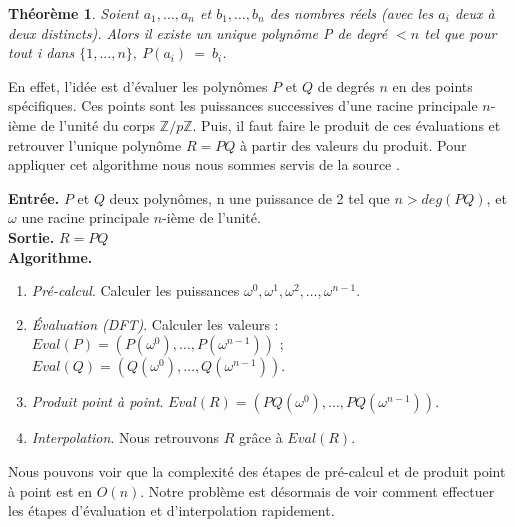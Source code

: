 \documentclass[12pt, a4paper]{article}
\begin{document}
\newtheorem{Thm1}{Théorème}
\begin{Thm1}
Soient $a_1,\dots,a_n$ et $b_1,\dots,b_n$ des nombres réels (avec les $a_i$ deux à deux distincts). Alors il existe un unique polynôme P de degré $< n$ tel que pour tout i dans $\{1,..., n\},\ P(a_i)\ =\ b_i$.
\end{Thm1}

En effet, l’idée est d’évaluer les polynômes $P$ et $Q$ de degrés $n$ en des points spécifiques. Ces points sont les puissances successives d'une racine principale $n$-ième de l'unité du corps $\mathbb{Z}/p\mathbb{Z}$. Puis, il faut faire le produit de ces évaluations et retrouver l’unique polynôme $R=PQ$ à partir des valeurs du produit. Pour appliquer cet algorithme nous nous sommes servis de la source \cite{AECF}. \\
 
\begin{tcolorbox}[colback=cyan!5!white,
                  colframe=cyan!100!black,
                  title=\textbf{Algorithme de multiplication par FFT}
                 ]
\textbf{Entrée.} $P$ et $Q$ deux polynômes, n une puissance de 2 tel que $n>deg(PQ)$, et $\omega$ une racine principale $n$-ième de l’unité. \\
\textbf{Sortie.} $R = PQ$ \\
\textbf{Algorithme.}
\begin{enumerate}[itemsep=-2ex]
\item\textit{Pré-calcul}. Calculer les puissances $\omega^0,\omega^1,\omega^2,\dots,\omega^{n-1}$. \\
\item\textit{Évaluation (DFT)}. Calculer les valeurs : \\ $Eval(P)=(P(\omega^0),\dots,P(\omega^{n-1}))$ ; $Eval(Q)=(Q(\omega^0),\dots,Q(\omega^{n-1}))$. \\
\item\textit{Produit point à point}. $Eval(R) = (PQ(\omega^0),\dots,PQ(\omega^{n-1}))$. \\
\item\textit{Interpolation}. Nous retrouvons $R$ grâce à $Eval(R)$.
\end{enumerate}
\end{tcolorbox}
Nous pouvons voir que la complexité des étapes de pré-calcul et de produit point à point est en $O(n)$. Notre problème est désormais de voir comment effectuer les étapes d'évaluation et d'interpolation rapidement.
\end{document}
